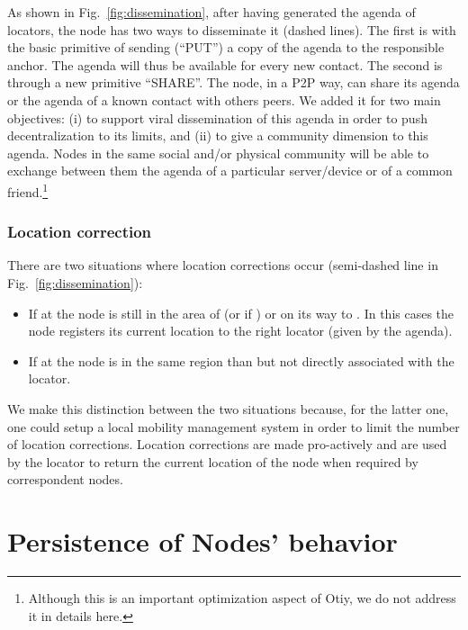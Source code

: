 \documentclass[a4paper]{sig-alternate-10pt}
\newcommand{\otiy}{{\sffamily Otiy}}
\begin{document}
As shown in Fig.~\ref{fig:dissemination}, after having generated the
agenda of locators, the node has two ways to disseminate it (dashed
lines). The first is with the basic primitive of sending (``PUT'') a
copy of the agenda to the responsible anchor. The agenda will thus
be available for every new contact. The second is through a new
primitive ``SHARE''. The node, in a \textsc{P2P} way, can share its
agenda or the agenda of a known contact with others peers. We added
it for two main objectives: (i) to support viral dissemination of
this agenda in order to push decentralization to its limits, and
(ii) to give a community dimension to this agenda. Nodes in the same
social and/or physical community will be able to exchange between
them the agenda of a particular server/device or of a common
friend.\footnote{Although this is an important optimization aspect
of \otiy, we do not address it in details here.}


\subsubsection{Location correction}

There are two situations where location corrections occur
(semi-dashed line in Fig.~\ref{fig:dissemination}):

\begin{itemize}

\item If at  the node is still in the area of 
(or  if ) or on its way to . In this 
cases the node registers its current location to the right locator 
(given by the agenda).

\item If at  the node is in the same region than 
but not directly associated with the locator.

\end{itemize}

We make this distinction between the two situations because, for the
latter one, one could setup a local mobility management system in
order to limit the number of location corrections. Location
corrections are made pro-actively and are used by the locator to
return the current location of the node when required by
correspondent nodes.



\section{Persistence of Nodes' behavior}
\label{sec:environment}
\end{document}
